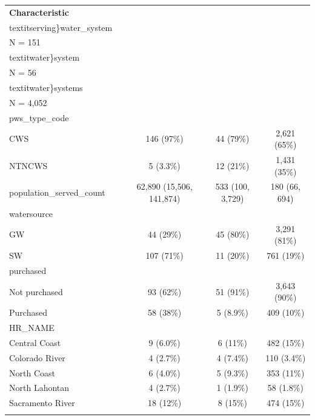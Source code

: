 \documentclass[
]{article}
\begin{document}
\begin{tabular}{l|c|c|c}
\hline
\textbf{Characteristic} & \makecell[c]{\textbf{carceral\\textit{serving\}water\_system}\ \ \\N = 151} & \makecell[c]{\textbf{carceral\\textit{water\}system}\ \ \\N = 56} & \makecell[c]{\textbf{other\\textit{water\}systems}\ \ \\N = 4,052}\\
\hline
pws\_type\_code &  &  & \\
\hline
\hspace{1em}CWS & 146 (97\%) & 44 (79\%) & 2,621 (65\%)\\
\hline
\hspace{1em}NTNCWS & 5 (3.3\%) & 12 (21\%) & 1,431 (35\%)\\
\hline
population\_served\_count & 62,890 (15,506, 141,874) & 533 (100, 3,729) & 180 (66, 694)\\
\hline
watersource &  &  & \\
\hline
\hspace{1em}GW & 44 (29\%) & 45 (80\%) & 3,291 (81\%)\\
\hline
\hspace{1em}SW & 107 (71\%) & 11 (20\%) & 761 (19\%)\\
\hline
purchased &  &  & \\
\hline
\hspace{1em}Not purchased & 93 (62\%) & 51 (91\%) & 3,643 (90\%)\\
\hline
\hspace{1em}Purchased & 58 (38\%) & 5 (8.9\%) & 409 (10\%)\\
\hline
HR\_NAME &  &  & \\
\hline
\hspace{1em}Central Coast & 9 (6.0\%) & 6 (11\%) & 482 (15\%)\\
\hline
\hspace{1em}Colorado River & 4 (2.7\%) & 4 (7.4\%) & 110 (3.4\%)\\
\hline
\hspace{1em}North Coast & 6 (4.0\%) & 5 (9.3\%) & 353 (11\%)\\
\hline
\hspace{1em}North Lahontan & 4 (2.7\%) & 1 (1.9\%) & 58 (1.8\%)\\
\hline
\hspace{1em}Sacramento River & 18 (12\%) & 8 (15\%) & 474 (15\%)\\
}}}
\end{tabular}
\end{document}
